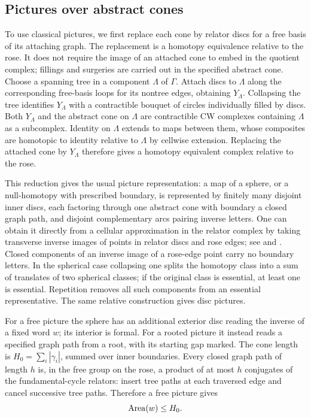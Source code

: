 \subsection{Pictures over abstract cones}

To use classical pictures, we first replace each cone by relator discs for a free basis of its attaching graph. The replacement is a homotopy equivalence relative to the rose. It does not require the image of an attached cone to embed in the quotient complex; fillings and surgeries are carried out in the specified abstract cone.
Choose a spanning tree in a component $\Lambda$ of $\Gamma$. Attach discs to $\Lambda$ along the corresponding free-basis loops for its nontree edges, obtaining $Y_\Lambda$. Collapsing the tree identifies $Y_\Lambda$ with a contractible bouquet of circles individually filled by discs. Both $Y_\Lambda$ and the abstract cone on $\Lambda$ are contractible CW complexes containing $\Lambda$ as a subcomplex. Identity on $\Lambda$ extends to maps between them, whose composites are homotopic to identity relative to $\Lambda$ by cellwise extension. Replacing the attached cone by $Y_\Lambda$ therefore gives a homotopy equivalent complex relative to the rose.

This reduction gives the usual picture representation: a map of a sphere, or a null-homotopy with prescribed boundary, is represented by finitely many disjoint inner discs, each factoring through one abstract cone with boundary a closed graph path, and disjoint complementary arcs pairing inverse letters. One can obtain it directly from a cellular approximation in the relator complex by taking transverse inverse images of points in relator discs and rose edges; see \cite{BP93} and \cite[Lemma~5.2]{OAI196}. Closed components of an inverse image of a rose-edge point carry no boundary letters. In the spherical case collapsing one splits the homotopy class into a sum of translates of two spherical classes; if the original class is essential, at least one is essential. Repetition removes all such components from an essential representative. The same relative construction gives disc pictures.

For a free picture the sphere has an additional exterior disc reading the inverse of a fixed word $w$; its interior is formal. For a rooted picture it instead reads a specified graph path from a root, with its starting gap marked. The cone length is $H_0=\sum_i|\gamma_i|$, summed over inner boundaries. Every closed graph path of length $h$ is, in the free group on the rose, a product of at most $h$ conjugates of the fundamental-cycle relators: insert tree paths at each traversed edge and cancel successive tree paths. Therefore a free picture gives
\begin{equation}\label{eq:area-cone-length}
 \operatorname{Area}(w)\le H_0.
\end{equation}


